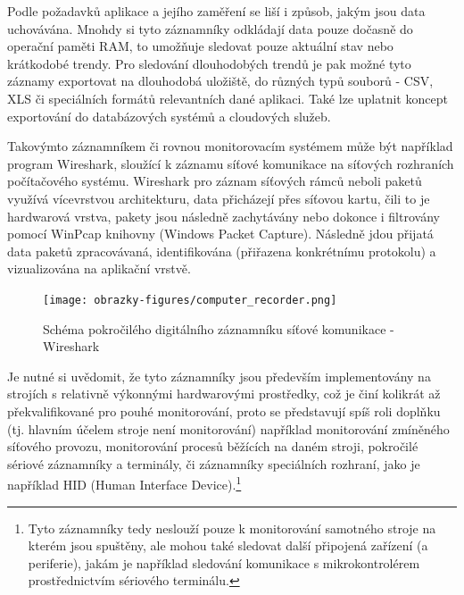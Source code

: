 % 
Podle požadavků aplikace a jejího zaměření se liší i způsob, jakým jsou data uchovávána. Mnohdy si tyto záznamníky odkládají data pouze dočasně do operační paměti RAM, to umožňuje sledovat pouze aktuální stav nebo krátkodobé trendy. Pro sledování dlouhodobých trendů je pak možné tyto záznamy exportovat na dlouhodobá uložiště, do různých typů souborů - CSV, XLS či speciálních formátů relevantních dané aplikaci. Také lze uplatnit koncept exportování do databázových systémů a cloudových služeb.

Takovýmto záznamníkem či rovnou monitorovacím systémem může být například program Wireshark, sloužící k záznamu síťové komunikace na síťových rozhraních počítačového systému. Wireshark pro záznam síťových rámců neboli paketů využívá vícevrstvou architekturu, data přicházejí přes síťovou kartu, čili to je hardwarová vrstva, pakety jsou následně zachytávány nebo dokonce i filtrovány pomocí WinPcap knihovny (Windows Packet Capture). Následně jdou přijatá data paketů zpracovávaná, identifikována (přiřazena konkrétnímu protokolu) a vizualizována na aplikační vrstvě. \cite{researchgate_wireshark_architecture, wireshark_architecture_diagram}

\begin{figure}[h]
    \centering
    \texttt{[image: obrazky-figures/computer\_recorder.png]}
    
    \caption{Schéma pokročilého digitálního záznamníku síťové komunikace - Wireshark \cite{researchgate_wireshark_architecture, winpcap_architecture}}
    \label{fig:computer-recorder}
\end{figure}

Je nutné si uvědomit, že tyto záznamníky jsou především implementovány na strojích s relativně výkonnými hardwarovými prostředky, což je činí kolikrát až překvalifikované pro pouhé monitorování, proto se představují spíš roli doplňku (tj. hlavním účelem stroje není monitorování) například monitorování zmíněného síťového provozu, monitorování procesů běžících na daném stroji, pokročilé sériové záznamníky a terminály, či záznamníky speciálních rozhraní, jako je například HID (Human Interface Device).\footnote{Tyto záznamníky tedy neslouží pouze k monitorování samotného stroje na kterém jsou spuštěny, ale mohou také sledovat další připojená zařízení (a periferie), jakám je například sledování komunikace s mikrokontrolérem prostřednictvím sériového terminálu.}

